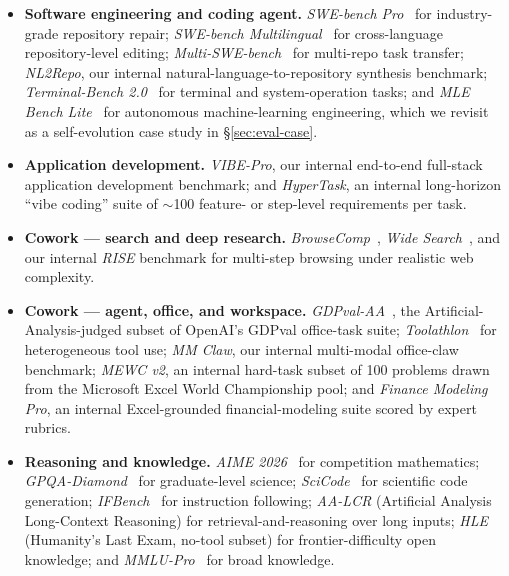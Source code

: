 \begin{itemize}
    \item \textbf{Software engineering and coding agent.} \emph{SWE-bench Pro}~\citep{swebenchpro2025} for industry-grade repository repair; \emph{SWE-bench Multilingual}~\citep{rashid2025swebenchmultilingual} for cross-language repository-level editing; \emph{Multi-SWE-bench}~\citep{multiswebench2025} for multi-repo task transfer; \emph{NL2Repo}, our internal natural-language-to-repository synthesis benchmark; \emph{Terminal-Bench 2.0}~\citep{merrill2026terminalbench} for terminal and system-operation tasks; and \emph{MLE Bench Lite}~\citep{chan2025mlebench} for autonomous machine-learning engineering, which we revisit as a self-evolution case study in \S\ref{sec:eval-case}.

    \item \textbf{Application development.} \emph{VIBE-Pro}, our internal end-to-end full-stack application development benchmark; and \emph{HyperTask}, an internal long-horizon ``vibe coding'' suite of $\sim$100 feature- or step-level requirements per task.

    \item \textbf{Cowork --- search and deep research.} \emph{BrowseComp}~\citep{wei2025browsecomp}, \emph{Wide Search}~\citep{liu2025widesearch}, and our internal \emph{RISE} benchmark for multi-step browsing under realistic web complexity.

    \item \textbf{Cowork --- agent, office, and workspace.} \emph{GDPval-AA}~\citep{patwardhan2025gdpvalevaluatingaimodel}, the Artificial-Analysis-judged subset of OpenAI's GDPval office-task suite; \emph{Toolathlon}~\citep{huang2025toolathlon} for heterogeneous tool use; \emph{MM Claw}, our internal multi-modal office-claw benchmark; \emph{MEWC v2}, an internal hard-task subset of 100 problems drawn from the Microsoft Excel World Championship pool; and \emph{Finance Modeling Pro}, an internal Excel-grounded financial-modeling suite scored by expert rubrics.

    \item \textbf{Reasoning and knowledge.} \emph{AIME 2026}~\citep{aime2026} for competition mathematics; \emph{GPQA-Diamond}~\citep{rein2024gpqa} for graduate-level science; \emph{SciCode}~\citep{tian2024scicode} for scientific code generation; \emph{IFBench}~\citep{pyatkin2025ifbench} for instruction following; \emph{AA-LCR} (Artificial Analysis Long-Context Reasoning) for retrieval-and-reasoning over long inputs; \emph{HLE}~\citep{phan2025humanity} (Humanity's Last Exam, no-tool subset) for frontier-difficulty open knowledge; and \emph{MMLU-Pro}~\citep{wang2024mmlu} for broad knowledge.
\end{itemize}

